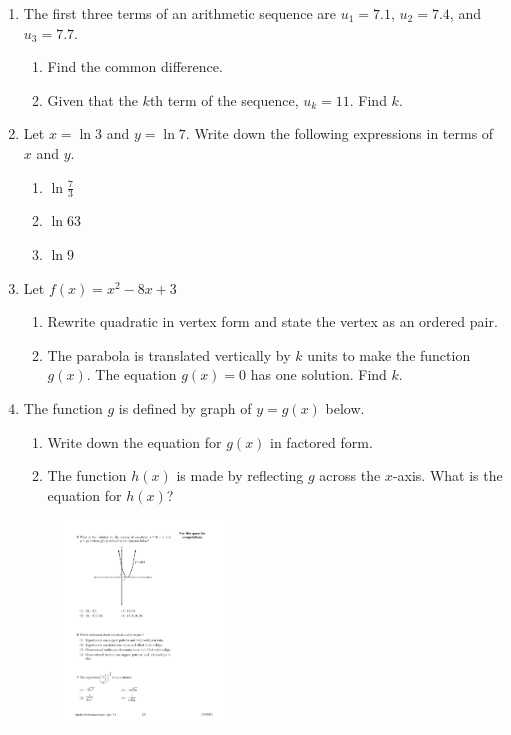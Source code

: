 \documentclass[12pt, twoside]{article}
\begin{document}
\begin{enumerate}[itemsep=0.25cm]
\item The first three terms of an arithmetic sequence are $u_1=7.1$, $u_2=7.4$, and $u_3=7.7$.
\begin{enumerate}
    \item Find the common difference.
    \item Given that the $k$th term of the sequence, $u_k=11$. Find $k$.
\end{enumerate}

\item Let $x=\ln 3$ and $y=\ln 7$. Write down the following expressions in terms of $x$ and $y$.
\begin{enumerate}
    \item $\ln \frac{7}{3}$
    \item $\ln 63$
    \item $\ln 9$
\end{enumerate}

\item Let $f(x) = x^2-8x+3$
\begin{enumerate}
    \item Rewrite quadratic in vertex form and state the vertex as an ordered pair.
    \item The parabola is translated vertically by $k$ units to make the function $g(x)$. The equation $g(x)=0$ has one solution. Find $k$.
\end{enumerate}

\item The function $g$ is defined by graph of $y=g(x)$ below.
\begin{enumerate}
    \item Write down the equation for $g(x)$ in factored form.
    \item The function $h(x)$ is made by reflecting $g$ across the $x$-axis. What is the equation for $h(x)$?
\end{enumerate}

\begin{figure}[!ht]
    \centering
    \includegraphics[width=0.4\textwidth]{../graphics/parabola-graphic.pdf}
\end{figure}
       
\end{enumerate}
\end{document}
